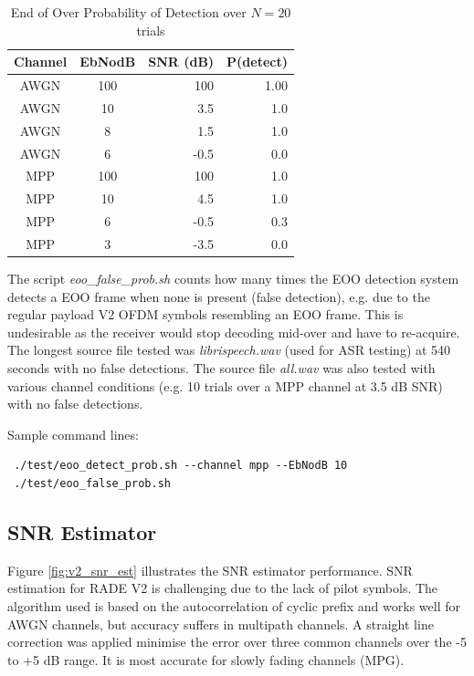 \documentclass{article}
\begin{document}
\begin{table} [h]
\caption{End of Over Probability of Detection over $N=20$ trials}
\label{tab:eoo_p_detetc}
\centering
\begin{tabular}{ c | c | r | r }
 \hline
 Channel & EbNodB & SNR (\si{dB}) & P(detect) \\
 \hline
 AWGN & 100 & 100 & 1.00 \\
 AWGN & 10 & 3.5 & 1.0 \\
 AWGN & 8 &  1.5 & 1.0 \\
 AWGN & 6 & -0.5 & 0.0 \\
 MPP & 100 & 100 &  1.0 \\
 MPP & 10 & 4.5 & 1.0 \\
 MPP & 6 & -0.5 & 0.3 \\
 MPP & 3 & -3.5 & 0.0 \\
 \hline
\end{tabular}
\end{table}

The script \emph{eoo\_false\_prob.sh} counts how many times the EOO detection system detects a EOO frame when none is present (false detection), e.g. due to the regular payload V2 OFDM symbols resembling an EOO frame. This is undesirable as the receiver would stop decoding mid-over and have to re-acquire. The longest source file tested was \emph{librispeech.wav} (used for ASR testing) at 540 seconds with no false detections.  The source file \emph{all.wav} was also tested with various channel conditions (e.g. 10 trials over a MPP channel at 3.5 dB SNR) with no false detections.

Sample command lines:
\begin{verbatim}
 ./test/eoo_detect_prob.sh --channel mpp --EbNodB 10
 ./test/eoo_false_prob.sh
\end{verbatim}

\subsection{SNR Estimator}

Figure \ref{fig:v2_snr_est} illustrates the SNR estimator performance.  SNR estimation for RADE V2 is challenging due to the lack of pilot symbols.  The algorithm used is based on the autocorrelation of cyclic prefix and works well for AWGN channels, but accuracy suffers in multipath channels.  A straight line correction was applied minimise the error over three common channels over the -5 to +5 \si{dB} range.  It is most accurate for slowly fading channels (MPG).
\end{document}
